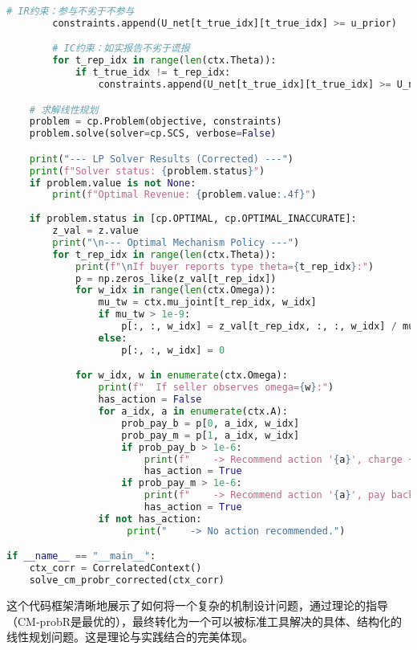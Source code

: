 \begin{lstlisting}[language=Python,style=pythonstyle]
        # IR约束：参与不劣于不参与
        constraints.append(U_net[t_true_idx][t_true_idx] >= u_prior)

        # IC约束：如实报告不劣于谎报
        for t_rep_idx in range(len(ctx.Theta)):
            if t_true_idx != t_rep_idx:
                constraints.append(U_net[t_true_idx][t_true_idx] >= U_net[t_true_idx][t_rep_idx])

    # 求解线性规划
    problem = cp.Problem(objective, constraints)
    problem.solve(solver=cp.SCS, verbose=False)

    print("--- LP Solver Results (Corrected) ---")
    print(f"Solver status: {problem.status}")
    if problem.value is not None:
        print(f"Optimal Revenue: {problem.value:.4f}")
        
    if problem.status in [cp.OPTIMAL, cp.OPTIMAL_INACCURATE]:
        z_val = z.value
        print("\n--- Optimal Mechanism Policy ---")
        for t_rep_idx in range(len(ctx.Theta)):
            print(f"\nIf buyer reports type theta={t_rep_idx}:")
            p = np.zeros_like(z_val[t_rep_idx])
            for w_idx in range(len(ctx.Omega)):
                mu_tw = ctx.mu_joint[t_rep_idx, w_idx]
                if mu_tw > 1e-9:
                    p[:, :, w_idx] = z_val[t_rep_idx, :, :, w_idx] / mu_tw
                else: 
                    p[:, :, w_idx] = 0

            for w_idx, w in enumerate(ctx.Omega):
                print(f"  If seller observes omega={w}:")
                has_action = False
                for a_idx, a in enumerate(ctx.A):
                    prob_pay_b = p[0, a_idx, w_idx]
                    prob_pay_m = p[1, a_idx, w_idx]
                    if prob_pay_b > 1e-6:
                        print(f"    -> Recommend action '{a}', charge {ctx.b} (Prob: {prob_pay_b:.2f})")
                        has_action = True
                    if prob_pay_m > 1e-6:
                        print(f"    -> Recommend action '{a}', pay back {ctx.M} (Prob: {prob_pay_m:.2f})")
                        has_action = True
                if not has_action:
                     print("    -> No action recommended.")

if __name__ == "__main__":
    ctx_corr = CorrelatedContext()
    solve_cm_probr_corrected(ctx_corr)    
\end{lstlisting}

这个代码框架清晰地展示了如何将一个复杂的机制设计问题，通过理论的指导（CM-probR是最优的），最终转化为一个可以被标准工具解决的具体、结构化的线性规划问题。这是理论与实践结合的完美体现。